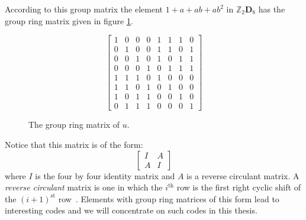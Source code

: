 According to this group matrix the element $1+a+ab+ab^2$ in $\mathbb{Z}_2 \mathbf{D}_8$ has the group ring matrix given in figure \ref{fig:rgmatz2d8}.
\begin{figure}[htbp]
\begin{center}
\[ \left[ \begin{array}{cccccccc}
1 & 0 & 0 & 0 & 1 & 1 & 1 & 0 \\
0 & 1 & 0 & 0 & 1 & 1 & 0 & 1 \\
0 & 0 & 1 & 0 & 1 & 0 & 1 & 1 \\
0 & 0 & 0 & 1 & 0 & 1 & 1 & 1 \\
1 & 1 & 1 & 0 & 1 & 0 & 0 & 0 \\
1 & 1 & 0 & 1 & 0 & 1 & 0 & 0 \\
1 & 0 & 1 & 1 & 0 & 0 & 1 & 0 \\
0 & 1 & 1 & 1 & 0 & 0 & 0 & 1
\end{array} \right] \]
\caption{The group ring matrix of $u$.}
\label{fig:rgmatz2d8}
\end{center}
\end{figure}
Notice that this matrix is of the form:
\[\left[ \begin{array}{c|c}
I & A \\
\hline
A & I
\end{array} \right] \]
where $I$ is the four by four identity matrix and $A$ is a reverse circulant matrix.
A \emph{reverse circulant} matrix is one in which the $i^{\textrm{th}}$ row is the first right cyclic shift of the $(i+1)^{\textrm{st}}$ row~\cite[p.~377]{huf03}.
Elements with group ring matrices of this form lead to interesting codes and we will concentrate on such codes in this thesis.

